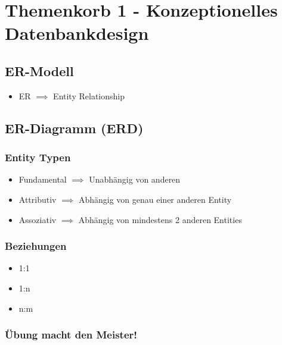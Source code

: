 \chapter{Themenkorb 1 - Konzeptionelles Datenbankdesign}

\section{ER-Modell}
\begin{itemize}
    \item ER $\implies$ Entity Relationship
\end{itemize}

\section{ER-Diagramm (ERD)}
\subsection{Entity Typen}
\begin{itemize}
    \item Fundamental $\implies$ Unabhängig von anderen 
    \item Attributiv $\implies$ Abhängig von genau einer anderen Entity
    \item Assoziativ $\implies$ Abhängig von mindestens 2 anderen Entities
\end{itemize}
\subsection{Beziehungen}
\begin{itemize}
    \item 1:1
    \item 1:n
    \item n:m
\end{itemize}
\subsection*{Übung macht den Meister!}